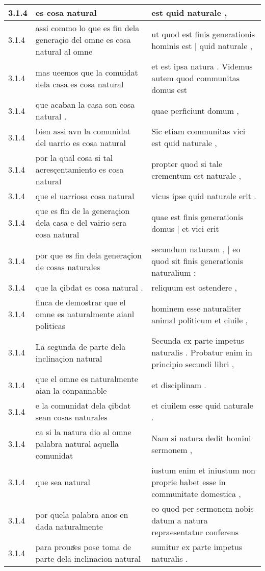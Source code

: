 \begin{tabular}{|p{1cm}|p{6.5cm}|p{6.5cm}|}
3.1.4 & es cosa natural & est quid naturale , \\\hline
3.1.4 & assi commo lo que es fin dela generaçio del omne es cosa natural al omne & ut quod est finis generationis hominis est | quid naturale , \\\hline
3.1.4 & mas ueemos que la comuidat dela casa es cosa natural & et est ipsa natura . Videmus autem quod communitas domus est \\\hline
3.1.4 & que acaban la casa son cosa natural . & quae perficiunt domum , \\\hline
3.1.4 & bien assi avn la comunidat del uarrio es cosa natural & Sic etiam communitas vici est quid naturale , \\\hline
3.1.4 & por la qual cosa si tal acresçentamiento es cosa natural & propter quod si tale crementum est naturale , \\\hline
3.1.4 & que el uarriosa cosa natural & vicus ipse quid naturale erit . \\\hline
3.1.4 & que es fin de la generaçion dela casa e del vairio sera cosa natural & quae est finis generationis domus | et vici erit \\\hline
3.1.4 & por que es fin dela generaçion de cosas naturales & secundum naturam , | eo quod sit finis generationis naturalium : \\\hline
3.1.4 & que la çibdat es cosa natural . & reliquum est ostendere , \\\hline
3.1.4 & finca de demostrar que el omne es naturalmente aianl politicas & hominem esse naturaliter animal politicum et ciuile , \\\hline
3.1.4 & La segunda de parte dela inclinaçion natural & Secunda ex parte impetus naturalis . Probatur enim in principio secundi libri , \\\hline
3.1.4 & que el omne es naturalmente aian la conpannable & et disciplinam . \\\hline
3.1.4 & e la comunidat dela çibdat sean cosas naturales & et ciuilem esse quid naturale . \\\hline
3.1.4 & ca si la natura dio al omne palabra natural aquella comunidat & Nam si natura dedit homini sermonem , \\\hline
3.1.4 & que sea natural & iustum enim et iniustum non proprie habet esse in communitate domestica , \\\hline
3.1.4 & por quela palabra anos en dada naturalmente & eo quod per sermonem nobis datum a natura repraesentatur conferens \\\hline
3.1.4 & para prouaͬes pose toma de parte dela inclinacion natural & sumitur ex parte impetus naturalis . \\\hline

\end{tabular}
